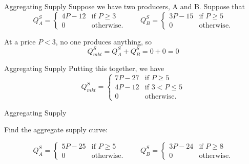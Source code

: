 \documentclass[12pt,t]{beamer}
\begin{document}
\begin{frame}{Aggregating Supply}
  Suppose we have two producers, A and B. Suppose that
  $$
    Q_A^S =
    \begin{cases}
      4P - 12 & \text{if } P \geq 3 \\
      0       & \text{otherwise}.
    \end{cases} 
    \quad\quad
    Q_B^S =
    \begin{cases}
      3P - 15 & \text{if } P  \geq 5 \\
      0       & \text{otherwise}.
    \end{cases}
  $$

  \vspace{10mm}


   {
    At a price $P < 3$, no one produces anything, so 
    $$Q_{mkt}^S = Q_A^S + Q_B^S = 0 + 0 = 0$$ 
  }
\end{frame}

\begin{frame}{Aggregating Supply}
  Putting this together, we have 
  $$
    Q_{mkt}^S =
    \begin{cases}
      7P - 27 & \text{if } P \geq 5     \\
      4P - 12 & \text{if } 3 < P \leq 5 \\
      0       & \text{otherwise}.
    \end{cases}
  $$
\end{frame}

\begin{frame}{Aggregating Supply}

  \bigskip
  Find the aggregate supply curve:

  $$
    Q_A^S =
    \begin{cases}
      5P - 25 & \text{if } P \geq 5 \\
      0       & \text{otherwise}.
    \end{cases}
    \quad\quad
    Q_B^S =
    \begin{cases}
      3P - 24 & \text{if } P  \geq 8 \\
      0       & \text{otherwise}.
    \end{cases}
  $$
\end{frame}
\end{document}
